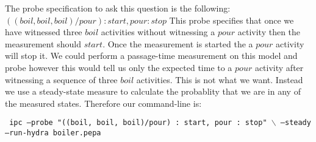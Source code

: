\documentclass[10pt,a4paper]{article}
\begin{document}
The probe specification to ask this question is the following:
$((boil, boil, boil)/pour) : start, pour : stop$
This probe specifies that once we have witnessed three $boil$ activities
without witnessing a $pour$ activity then the measurement should $start$.
Once the measurement is started the a $pour$ activity will stop it.
We could perform a passage-time measurement on this model and probe however
this would tell us only the expected time to a $pour$ activity after witnessing
a sequence of three $boil$ activities. This is not what we want.
Instead we use a steady-state measure to calculate the probablity that we are
in any of the measured states.
Therefore our command-line is:

\noindent
\texttt{
ipc --probe "((boil, boil, boil)/pour) : start, pour : stop" 
$\backslash$ \newline \hspace*{2cm} --steady --run-hydra boiler.pepa
}





\end{document}
